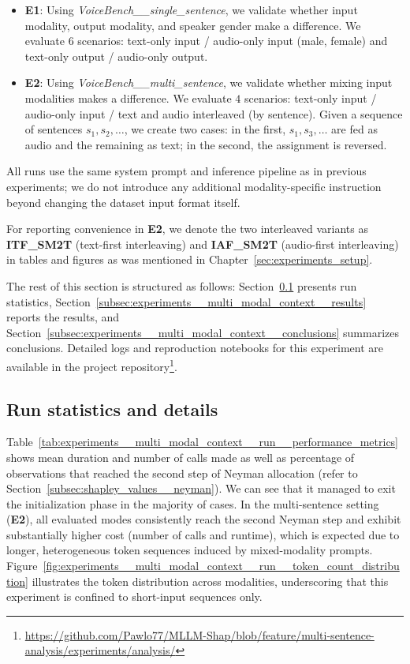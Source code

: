 \begin{itemize}
    \item \textbf{E1}: Using \textit{VoiceBench\_\_single\_sentence}, we validate whether input modality, output modality, and speaker gender make a difference. We evaluate $6$ scenarios: text-only input / audio-only input (male, female) and text-only output / audio-only output.

    \item \textbf{E2}: Using \textit{VoiceBench\_\_multi\_sentence}, we validate whether mixing input modalities makes a difference. We evaluate $4$ scenarios: text-only input / audio-only input / text and audio interleaved (by sentence). Given a sequence of sentences $s_1, s_2, \dots$, we create two cases: in the first, $s_1, s_3, \dots$ are fed as audio and the remaining as text; in the second, the assignment is reversed.
\end{itemize}

All runs use the same system prompt and inference pipeline as in previous experiments; we do not introduce any additional modality-specific instruction beyond changing the dataset input format itself.

\newpage
For reporting convenience in \textbf{E2}, we denote the two interleaved variants as \textbf{ITF\_SM2T} (text-first interleaving) and \textbf{IAF\_SM2T} (audio-first interleaving) in tables and figures as was mentioned in Chapter~\ref{sec:experiments_setup}.

The rest of this section is structured as follows: Section~\ref{subsec:experiments__multi_modal_context__run} presents run statistics, Section~\ref{subsec:experiments__multi_modal_context__results} reports the results, and Section~\ref{subsec:experiments__multi_modal_context__conclusions} summarizes conclusions. Detailed logs and reproduction notebooks for this experiment are available in the project repository\footnote{\url{https://github.com/Pawlo77/MLLM-Shap/blob/feature/multi-sentence-analysis/experiments/analysis/}}.

\subsection{Run statistics and details}
\label{subsec:experiments__multi_modal_context__run}

Table~\ref{tab:experiments__multi_modal_context__run__performance_metrics} shows mean duration and number of calls made as well as percentage of observations that reached the second step of Neyman allocation (refer to Section~\ref{subsec:shapley_values__neyman}). We can see that it managed to exit the initialization phase in the majority of cases. In the multi-sentence setting (\textbf{E2}), all evaluated modes consistently reach the second Neyman step and exhibit substantially higher cost (number of calls and runtime), which is expected due to longer, heterogeneous token sequences induced by mixed-modality prompts. Figure~\ref{fig:experiments__multi_modal_context__run__token_count_distribution} illustrates the token distribution across modalities, underscoring that this experiment is confined to short-input sequences only.

